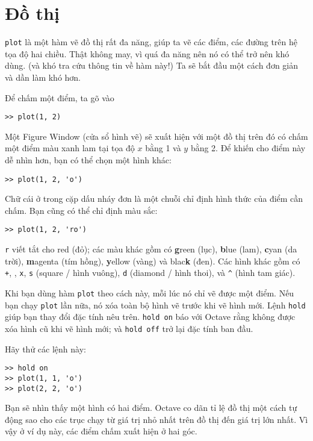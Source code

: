 \documentclass[12pt]{book}
\begin{document}
\section{Đồ thị}
\label{plotting}

{\tt plot} là một hàm vẽ đồ thị rất đa năng, giúp ta vẽ các điểm,
các đường trên hệ tọa độ hai chiều. Thật không may, vì quá đa năng
nên nó có thể trở nên khó dùng. (và khó tra cứu thông tin về hàm này!)
Ta sẽ bắt đầu một cách đơn giản và dần làm khó hơn.

Để chấm một điểm, ta gõ vào

\begin{verbatim}
>> plot(1, 2)
\end{verbatim}

Một {\sf Figure Window} (cửa sổ hình vẽ) sẽ xuất hiện với một đồ thị
trên đó có chấm một điểm màu xanh lam tại tọa độ $x$ bằng 1 và 
$y$ bằng 2. Để khiến cho điểm này dễ nhìn hơn, bạn có thể chọn một
hình khác:

\begin{verbatim}
>> plot(1, 2, 'o')
\end{verbatim}
%
Chữ cái ở trong cặp dấu nháy đơn là một chuỗi chỉ định hình thức
của điểm cần chấm. Bạn cũng có thể chỉ định màu sắc:

\begin{verbatim}
>> plot(1, 2, 'ro')
\end{verbatim}
%
{\tt r} viết tắt cho red (đỏ); các màu khác gồm có {\bf g}reen (lục),
{\bf b}lue (lam), {\bf c}yan (da trời), {\bf m}agenta (tím hồng), 
{\bf y}ellow (vàng) và blac{\bf k} (đen).
Các hình khác gồm có {\tt +}, 
{\tt *}, 
{\tt x}, 
{\tt s} (square / hình vuông), 
{\tt d} (diamond / hình thoi), và 
\verb+^+ (hình tam giác). 

Khi bạn dùng hàm {\tt plot} theo cách này, mỗi lúc nó chỉ vẽ được một điểm.
Nếu bạn chạy {\tt plot} lần nữa, nó xóa toàn bộ hình vẽ trước khi vẽ hình mới. 
Lệnh {\tt hold} giúp bạn thay đổi đặc tính nêu trên. {\tt hold on} báo với 
Octave rằng không được xóa hình cũ khi vẽ hình mới; và {\tt hold off}
trở lại đặc tính ban đầu.

Hãy thử các lệnh này:

\begin{verbatim}
>> hold on
>> plot(1, 1, 'o')
>> plot(2, 2, 'o')
\end{verbatim}
%
Bạn sẽ nhìn thấy một hình có hai điểm. Octave co dãn tỉ lệ đồ thị
một cách tự động sao cho các trục chạy từ giá trị nhỏ nhất trên đồ thị
đến giá trị lớn nhất. Vì vậy ở ví dụ này, các điểm chấm xuất hiện ở
hai góc.
\end{document}
